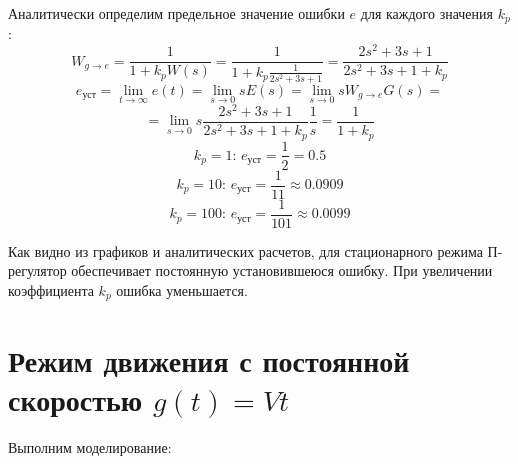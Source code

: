 Аналитически определим предельное значение ошибки $e$ для каждого значения $k_p$:
\[
W_{g\to e} = \frac{1}{1 + k_p W(s)} 
= \frac{1}{1 + k_p \frac{1}{2s^2 + 3s + 1}} 
= \frac{2s^2 + 3s + 1}{2s^2 + 3s + 1 + k_p}
\]
\[
e_{\text{уст}} = \lim_{t \to \infty} e(t) 
= \lim_{s \to 0} s E(s) 
= \lim_{s \to 0} s W_{g\to e} G(s) =
\]\[
= \lim_{s \to 0} s \frac{2s^2 + 3s + 1}{2s^2 + 3s + 1 + k_p} \frac{1}{s}
= \frac{1}{1 + k_p}
\]
\[
k_p = 1: \, e_{\text{уст}} = \frac{1}{2} = 0.5
\]
\[
k_p = 10: \, e_{\text{уст}} = \frac{1}{11} \approx 0.0909
\]
\[
k_p = 100: \, e_{\text{уст}} = \frac{1}{101} \approx 0.0099
\]

Как видно из графиков и аналитических расчетов, для стационарного режима
П-регулятор обеспечивает постоянную установившеюся ошибку. При увеличении
коэффициента $k_p$ ошибка уменьшается.
\newpage
\section{Режим движения с постоянной скоростью $g(t) = Vt$}
Выполним моделирование:
